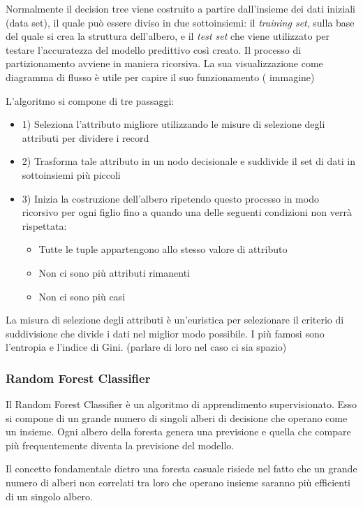\documentclass[12pt,italian]{report}
\begin{document}
Normalmente il decision tree viene costruito a partire dall'insieme dei dati iniziali (data set), il quale può essere diviso in due sottoinsiemi: il \textit{training set}, sulla base del quale si crea la struttura dell'albero, e il \textit{test set} che viene utilizzato per testare l'accuratezza del modello predittivo così creato.
Il processo di partizionamento avviene in maniera ricorsiva. La sua visualizzazione come diagramma di flusso è utile per capire il suo funzionamento ( immagine)

L'algoritmo si compone di tre passaggi:
\begin{itemize}
	\item 1) Seleziona l'attributo migliore utilizzando le misure di selezione degli attributi per dividere i record
	\item 2) Trasforma tale attributo in un nodo decisionale e suddivide il set di dati in sottoinsiemi più piccoli
	\item 3) Inizia la costruzione dell'albero ripetendo questo processo in modo ricorsivo per ogni figlio fino a quando una delle seguenti condizioni non verrà rispettata:
	\begin{itemize}
		\item Tutte le tuple appartengono allo stesso valore di attributo
		\item Non ci sono più attributi rimanenti
		\item Non ci sono più casi
	\end{itemize}
\end{itemize}

La misura di selezione degli attributi è un'euristica per selezionare il criterio di suddivisione che divide i dati nel miglior modo possibile. I più famosi sono l'entropia e l'indice di Gini.
(parlare di loro nel caso ci sia spazio)

\subsubsection{Random Forest Classifier}
Il Random Forest Classifier è un algoritmo di apprendimento supervisionato. Esso si compone di un grande numero di singoli alberi di decisione che operano come un insieme. Ogni albero della foresta genera una previsione e quella che compare più frequentemente diventa la previsione del modello. 

Il concetto fondamentale dietro una foresta casuale risiede nel fatto che un grande numero di alberi non correlati tra loro che operano insieme saranno più efficienti di un singolo albero.
\end{document}
